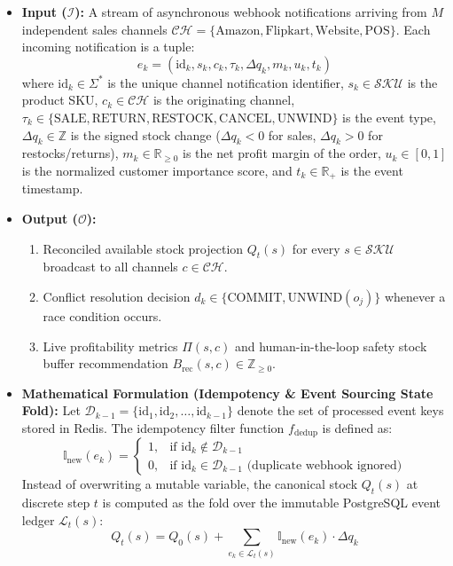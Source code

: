 \documentclass[oneside,a4paper,12pt]{report}
\begin{document}
\begin{itemize}
  \item \textbf{Input ($\mathcal{I}$):} A stream of asynchronous webhook notifications arriving from $M$ independent sales channels $\mathcal{CH} = \{\text{Amazon},\allowbreak \text{Flipkart},\allowbreak \text{Website},\allowbreak \text{POS}\}$. Each incoming notification is a tuple:
  \begin{equation}
  e_k = (\text{id}_k, s_k, c_k, \tau_k, \Delta q_k, m_k, u_k, t_k)
  \end{equation}
  where $\text{id}_k \in \Sigma^*$ is the unique channel notification identifier, $s_k \in \mathcal{SKU}$ is the product SKU, $c_k \in \mathcal{CH}$ is the originating channel, $\tau_k \in \{\text{SALE},\allowbreak \text{RETURN},\allowbreak \text{RESTOCK},\allowbreak \text{CANCEL},\allowbreak \text{UNWIND}\}$ is the event type, $\Delta q_k \in \mathbb{Z}$ is the signed stock change ($\Delta q_k < 0$ for sales, $\Delta q_k > 0$ for restocks/returns), $m_k \in \mathbb{R}_{\ge 0}$ is the net profit margin of the order, $u_k \in [0, 1]$ is the normalized customer importance score, and $t_k \in \mathbb{R}_+$ is the event timestamp.

  \item \textbf{Output ($\mathcal{O}$):}
  \begin{enumerate}
    \item Reconciled available stock projection $Q_t(s)$ for every $s \in \mathcal{SKU}$ broadcast to all channels $c \in \mathcal{CH}$.
    \item Conflict resolution decision $d_k \in \{\text{COMMIT}, \text{UNWIND}(o_j)\}$ whenever a race condition occurs.
    \item Live profitability metrics $\Pi(s, c)$ and human-in-the-loop safety stock buffer recommendation $B_{\text{rec}}(s, c) \in \mathbb{Z}_{\ge 0}$.
  \end{enumerate}

  \item \textbf{Mathematical Formulation (Idempotency \& Event Sourcing State Fold):}
  Let $\mathcal{D}_{k-1} = \{\text{id}_1, \text{id}_2, \dots, \text{id}_{k-1}\}$ denote the set of processed event keys stored in Redis. The idempotency filter function $f_{\text{dedup}}$ is defined as:
  \begin{equation}
  \mathbb{I}_{\text{new}}(e_k) = \begin{cases} 1, & \text{if } \text{id}_k \notin \mathcal{D}_{k-1} \\ 0, & \text{if } \text{id}_k \in \mathcal{D}_{k-1} \text{ (duplicate webhook ignored)} \end{cases}
  \end{equation}
  Instead of overwriting a mutable variable, the canonical stock $Q_t(s)$ at discrete step $t$ is computed as the fold over the immutable PostgreSQL event ledger $\mathcal{L}_t(s)$:
  \begin{equation}
  Q_t(s) = Q_0(s) + \sum_{e_k \in \mathcal{L}_t(s)} \mathbb{I}_{\text{new}}(e_k) \cdot \Delta q_k
  \end{equation}


\end{itemize}
\end{document}
